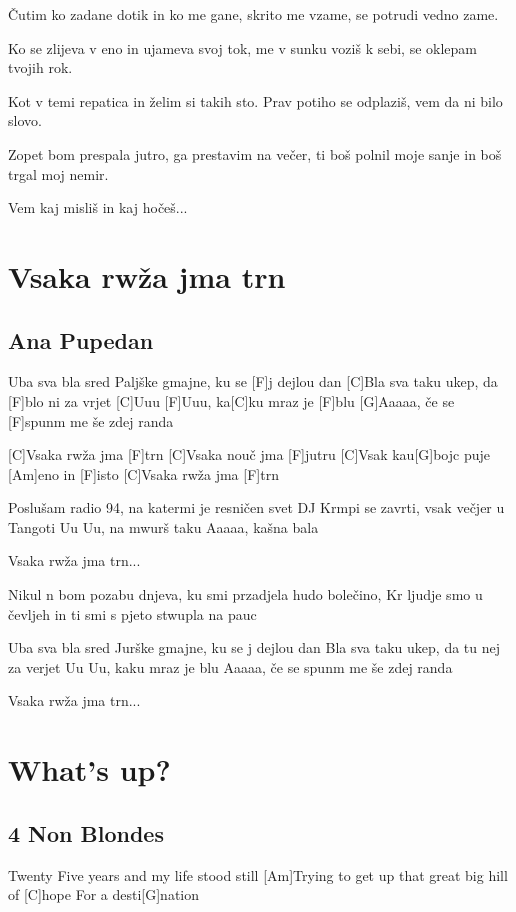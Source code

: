 \documentclass[a4paper,12pt]{article}
\begin{document}
\begin{multicols}{2}
\begin{guitar}
Čutim ko zadane dotik 
in ko me gane,
skrito me vzame, 
se potrudi vedno zame. 


Ko se zlijeva v eno 
in ujameva svoj tok, 
me v sunku voziš k sebi, 
se oklepam tvojih rok. 


Kot v temi repatica
in želim si takih sto.
Prav potiho se odplaziš, 
vem da ni bilo slovo. 


Zopet bom prespala jutro,
ga prestavim na večer,
ti boš polnil moje sanje 
in boš trgal moj nemir. 


Vem kaj misliš in kaj hočeš...

\end{guitar}
\section{Vsaka rwža jma trn}
\subsection*{Ana Pupedan}
\begin{guitar}
[C]Uba sva bla sred Paljške gmajne, 
ku se [F]j dejlou dan
[C]Bla sva taku ukep, da [F]blo ni za vrjet
[C]Uuu [F]Uuu, ka[C]ku mraz je [F]blu
[G]Aaaaa, če se [F]spunm me še zdej randa


[C]Vsaka rwža jma [F]trn
[C]Vsaka nouč jma [F]jutru
[C]Vsak kau[G]bojc puje [Am]eno in [F]isto
[C]Vsaka rwža jma [F]trn


Poslušam radio 94, na katermi je resničen svet
DJ Krmpi se zavrti, vsak večjer u Tangoti
Uu Uu, na mwurš taku
Aaaaa, kašna bala


Vsaka rwža jma trn...


Nikul n bom pozabu dnjeva, 
ku smi przadjela hudo bolečino,
Kr ljudje smo u čevljeh 
in ti smi s pjeto stwupla na pauc


Uba sva bla sred Jurške gmajne, 
ku se j dejlou dan
Bla sva taku ukep, da tu nej za verjet
Uu Uu, kaku mraz je blu
Aaaaa, če se spunm me še zdej randa


Vsaka rwža jma trn...

\end{guitar}
\section{What's up?}
\subsection*{4 Non Blondes}
\begin{guitar}
[G]Twenty Five years and my life stood still
[Am]Trying to get up that 
great big hill of [C]hope
For a desti[G]nation



\end{guitar}
\end{multicols}
\end{document}
